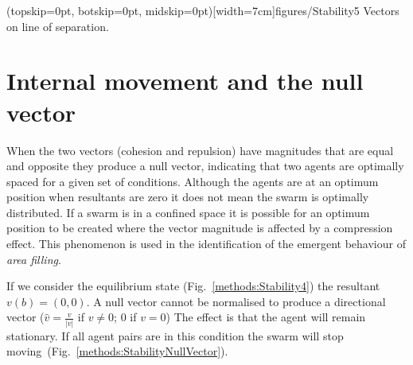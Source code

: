 \documentclass{ieeeaccess}
\begin{document}

\Figure[t!](topskip=0pt, botskip=0pt, midskip=0pt)[width=7cm]{figures/Stability5}
{Vectors on line of separation.\label{methods:Stability5}}


\section{Internal movement and the null vector}\label{Section:StabilityNullVector}

When the two vectors (cohesion and repulsion) have magnitudes that are equal
and opposite they produce a null vector, indicating that two agents are
optimally spaced for a given set of conditions. Although the agents are at an
optimum position when resultants are zero it does not mean the swarm is
optimally distributed. If a swarm is in a confined space it is possible for an
optimum position to be created where the vector magnitude is affected by a
compression effect. This phenomenon is used in the identification of the
emergent behaviour of \textit{area filling}.  

If we consider the equilibrium state (Fig.~\ref{methods:Stability4}) the
resultant $v(b)=(0,0)$. A null vector cannot be normalised to produce a
directional vector ($\hat{v} = \frac{v}{|v|}$ if $v\neq0$; $0$ if $v=0$) The
effect is that the agent will remain stationary. If all agent pairs are in this
condition the swarm will stop moving~(Fig.~\ref{methods:StabilityNullVector}).
\end{document}

